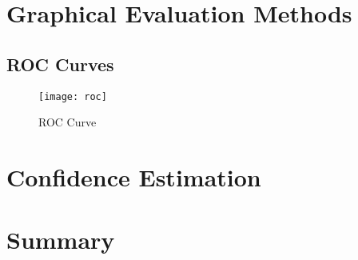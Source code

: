 \documentclass[10pt]{unbthesis}
\begin{document}
\section*{Graphical Evaluation Methods}
\subsection*{ROC Curves}
\begin{figure}
  \begin{center}
	\texttt{[image: roc]}
  \end{center}
  \caption{ROC Curve}
  \label{fig:roc}
\end{figure} 


\section*{Confidence Estimation}


\section*{Summary}


\renewcommand{\bibname}{References}



\end{document}
